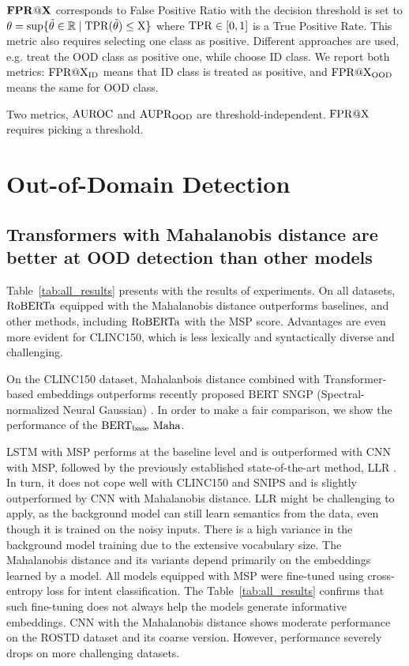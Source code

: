 \documentclass[letterpaper, final]{article} %
\begin{document}
$\rm{\mathbf{FPR@X}} $ corresponds to False Positive Ratio with the decision threshold is set to
$
\theta = \sup \{\tilde\theta \in \mathbb{R} \mid \rm{TPR}(\tilde\theta) \leq X \}
$
where $\rm{TPR} \in [0,1]$ is a True Positive Rate. This metric also requires selecting one class as positive. Different approaches are used, e.g. \citet*{ll_ratio_nlp_facebook} treat the OOD class as positive one, while \citet*{zheng2020out} choose ID class. We report both metrics:  $\rm{FPR@X}_{ID}$ means that ID class is treated as positive, and $\rm{FPR@X}_{OOD}$ means the same for OOD class.


Two metrics, $\rm{AUROC}$ and $\rm{AUPR}_{OOD}$ are threshold-independent. $\rm{FPR@X} $ requires picking a threshold.



\section{Out-of-Domain Detection}
\label{sec: experiments}
\subsection{Transformers with Mahalanobis distance  are better at OOD detection than other models}

Table~\ref{tab:all_results} presents with the results of experiments. On all datasets, $\rm{RoBERTa}$ equipped with the Mahalanobis distance outperforms baselines, and other methods, including $\rm{RoBERTa}$ with the MSP score. Advantages are even more evident for CLINC150, which is less lexically and syntactically diverse and challenging.

On the CLINC150 dataset, Mahalanbois distance combined with  Transformer-based embeddings outperforms recently proposed BERT SNGP (Spectral-normalized Neural Gaussian) \cite{liu2020simple}. In order to make a fair comparison, we show the performance of the $\rm{BERT_{base}\ Maha}$.

LSTM with MSP performs at the baseline level and is outperformed with CNN with MSP, followed by the previously established state-of-the-art method, LLR \cite{ll_ratio_nlp_facebook}.
In turn, it does not cope well with CLINC150 and SNIPS and is slightly outperformed by CNN with Mahalanobis distance. LLR might be challenging to apply, as the background model can still learn semantics from the data, even though it is trained on the noisy inputs. There is a high variance in the background model training due to the extensive vocabulary size.
The Mahalanobis distance and its variants depend primarily on the embeddings learned by a model. All models equipped with MSP were fine-tuned using cross-entropy loss for intent classification.  The Table~\ref{tab:all_results} confirms that such fine-tuning does not always help the models generate informative embeddings. CNN with the Mahalanobis distance shows moderate performance on the ROSTD dataset and its coarse version. However, performance severely drops on more challenging datasets.
\end{document}

